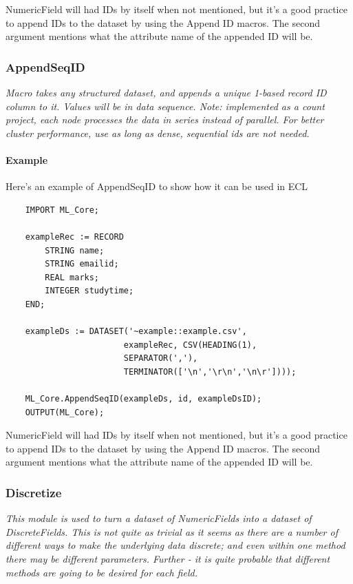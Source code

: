 \documentclass[a4paper,oneside,12pt]{book}
\begin{document}
NumericField will had IDs by itself when not mentioned, but it's a good practice to append IDs to the dataset by using the Append ID macros. The second argument mentions what the attribute name of the appended ID will be.

\subsubsection{AppendSeqID}\label{mlcore:appendseqid}

\textit{Macro takes any structured dataset, and appends a unique 1-based record ID column to it. Values will be in data sequence. Note: implemented as a count project, each node processes the data in series instead of parallel. For better cluster performance, use  as long as dense, sequential ids are not needed.}

\paragraph{Example}

Here's an example of AppendSeqID to show how it can be used in ECL

\begin{lstlisting}
    IMPORT ML_Core;
    
    exampleRec := RECORD
        STRING name;
        STRING emailid;
        REAL marks;
        INTEGER studytime;
    END;
    
    exampleDs := DATASET('~example::example.csv', 
                        exampleRec, CSV(HEADING(1),
                        SEPARATOR(','),
                        TERMINATOR(['\n','\r\n','\n\r'])));
    
    ML_Core.AppendSeqID(exampleDs, id, exampleDsID);
    OUTPUT(ML_Core);
\end{lstlisting}

NumericField will had IDs by itself when not mentioned, but it's a good practice to append IDs to the dataset by using the Append ID macros. The second argument mentions what the attribute name of the appended ID will be.

\subsubsection{Discretize}\label{mlcore:discretize}

\textit{This module is used to turn a dataset of NumericFields into a dataset of DiscreteFields. This is not quite as trivial as it seems as there are a number of different ways to make the underlying data discrete; and even within one method there may be different parameters. Further - it is quite probable that different methods are going to be desired for each field.}
\end{document}
